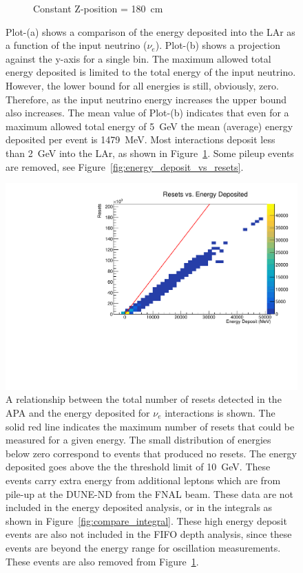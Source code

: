 \begin{figure}
\begin{subfigure}{.5\textwidth}
  \caption{Constant Z-position = 180~\unit{cm}}
\end{subfigure}
\caption{Plot-(a) shows a comparison of the energy deposited into the LAr as a function of the input neutrino ($\nu_{e}$).
Plot-(b) shows a projection against the y-axis for a single bin.
The maximum allowed total energy deposited is limited to the total energy of the input neutrino.
However, the lower bound for all energies is still, obviously, zero.
Therefore, as the input neutrino energy increases the upper bound also increases.
The mean value of Plot-(b) indicates that even for a maximum allowed total energy of 5~\unit{GeV} the mean (average) energy deposited per event is 1479~\unit{MeV}.
Most interactions deposit less than 2~\unit{GeV} into the LAr, as shown in Figure~\ref{fig:example_energy_deposit}.
Some pileup events are removed, see Figure~\ref{fig:energy_deposit_vs_resets}.
}
\label{fig:example_energy_deposit}
\end{figure}

\begin{figure}[]
\centering
\includegraphics[width=\textwidth]{images/resets_vs_energy_deposit.pdf}
\caption{A relationship between the total number of resets detected in the APA and the energy deposited for $\nu_{e}$ interactions is shown.
The solid red line indicates the maximum number of resets that could be measured for a given energy.
The small distribution of energies below zero correspond to events that produced no resets.
The energy deposited goes above the the threshold limit of 10~\unit{GeV}.
These events carry extra energy from additional leptons which are from pile-up at the DUNE-ND from the FNAL beam.
These data are not included in the energy deposited analysis, or in the integrals as shown in Figure~\ref{fig:compare_integral}.
These high energy deposit events are also not included in the FIFO depth analysis, since these events are beyond the energy range for oscillation measurements.
These events are also removed from Figure~\ref{fig:example_energy_deposit}.
}
\end{figure}~\label{fig:energy_deposit_vs_resets}


